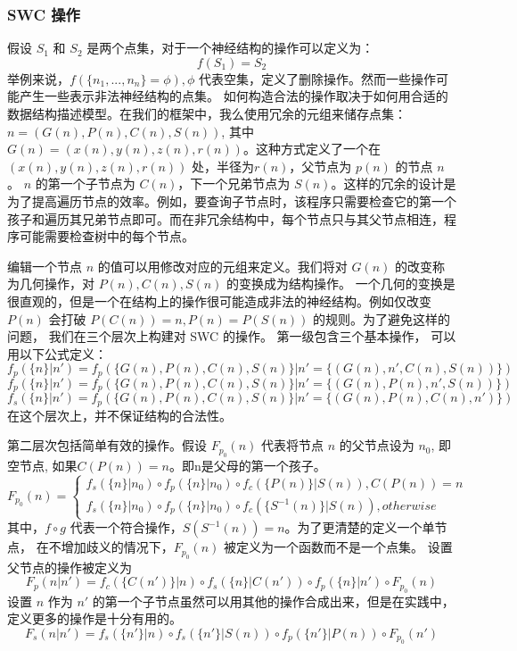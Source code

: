 {\subsubsection{SWC 操作}
假设 $S_1$ 和 $S_2$ 是两个点集，对于一个神经结构的操作可以定义为：
$$f(S_1) = S_2$$
举例来说，$f(\{n_1,...,n_n \} = \phi), \phi$ 代表空集，定义了删除操作。然而一些操作可能产生一些表示非法神经结构的点集。 如何构造合法的操作取决于如何用合适的数据结构描述模型。在我们的框架中，我么使用冗余的元组来储存点集：$n=(G(n), P(n), C(n), S(n))$, 其中 $G(n) = (x(n), y(n), z(n), r(n))$。这种方式定义了一个在$(x(n), y(n), z(n), r(n))$ 处，半径为$r(n)$，父节点为 $p(n)$ 的节点 $n$。 $n$ 的第一个子节点为 $C(n)$，下一个兄弟节点为 $S(n)$。这样的冗余的设计是为了提高遍历节点的效率。例如，要查询子节点时，该程序只需要检查它的第一个孩子和遍历其兄弟节点即可。而在非冗余结构中，每个节点只与其父节点相连，程序可能需要检查树中的每个节点。

编辑一个节点 $n$ 的值可以用修改对应的元组来定义。我们将对 $G(n)$ 的改变称为几何操作，对 $P(n), C(n), S(n) $ 的变换成为结构操作。 一个几何的变换是很直观的，但是一个在结构上的操作很可能造成非法的神经结构。例如仅改变 $P(n)$ 会打破 $P(C(n)) = n, P(n) = P(S(n))$ 的规则。为了避免这样的问题， 我们在三个层次上构建对 SWC 的操作。 第一级包含三个基本操作， 可以用以下公式定义：
$$f_p(\{n\}|n') = f_p(\{G(n), P(n), C(n), S(n)\}|n' = \{(G(n), n', C(n), S(n))\})$$
$$f_p(\{n\}|n') = f_p(\{G(n), P(n), C(n), S(n)\}|n' = \{(G(n), P(n), n', S(n))\})$$
$$f_s(\{n\}|n') = f_p(\{G(n), P(n), C(n), S(n)\}|n' = \{(G(n), P(n), C(n), n')\})$$
在这个层次上，并不保证结构的合法性。

第二层次包括简单有效的操作。假设 $F_{p_0}(n)$ 代表将节点 $n$ 的父节点设为 $n_0$, 即空节点, 如果$C(P(n)) = n$。即n是父母的第一个孩子。
$$
F_{p_0}(n) =
\left\{
\begin{aligned}
f_s(\{n\} | n_0) \circ f_p(\{n\} | n_0) \circ f_c(\{P(n)\} | S(n)), C(P(n)) = n\\
f_s(\{n\} | n_0) \circ f_p(\{n\} | n_0) \circ f_c(\{S^{-1}(n)\} | S(n)), otherwise
\end{aligned}
\right.
$$
其中，$f \circ g$ 代表一个符合操作，$S(S^{-1}(n)) = n$。为了更清楚的定义一个单节点， 在不增加歧义的情况下，$F_{p_0}(n)$ 被定义为一个函数而不是一个点集。
设置父节点的操作被定义为
$$F_p(n|n') = f_c(\{C(n')\}|n) \circ f_s(\{n\}|C(n'))  \circ f_p(\{n\}|n') \circ F_{p_0}(n)$$
设置 $n$ 作为 $n'$ 的第一个子节点虽然可以用其他的操作合成出来，但是在实践中，定义更多的操作是十分有用的。
$$F_s(n|n') = f_s(\{n'\}|n) \circ f_s(\{n'\}|S(n))  \circ f_p(\{n'\}|P(n)) \circ F_{p_0}(n')$$

}

